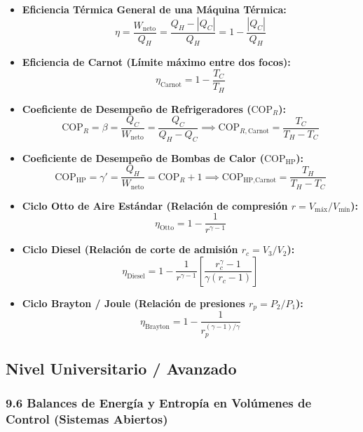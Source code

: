 \documentclass[11pt,a4paper]{article}
\begin{document}
\begin{itemize}
  \item \textbf{Eficiencia Térmica General de una Máquina Térmica:}
  \[
    \eta = \frac{W_{\text{neto}}}{Q_H} = \frac{Q_H - |Q_C|}{Q_H} = 1 - \frac{|Q_C|}{Q_H}
  \]
  \item \textbf{Eficiencia de Carnot (Límite máximo entre dos focos):}
  \[
    \eta_{\text{Carnot}} = 1 - \frac{T_C}{T_H}
  \]
  \item \textbf{Coeficiente de Desempeño de Refrigeradores ($\text{COP}_R$):}
  \[
    \text{COP}_R = \beta = \frac{Q_C}{W_{\text{neto}}} = \frac{Q_C}{Q_H - Q_C} \implies \text{COP}_{R,\text{Carnot}} = \frac{T_C}{T_H - T_C}
  \]
  \item \textbf{Coeficiente de Desempeño de Bombas de Calor ($\text{COP}_{\text{HP}}$):}
  \[
    \text{COP}_{\text{HP}} = \gamma' = \frac{Q_H}{W_{\text{neto}}} = \text{COP}_R + 1 \implies \text{COP}_{\text{HP},\text{Carnot}} = \frac{T_H}{T_H - T_C}
  \]
  \item \textbf{Ciclo Otto de Aire Estándar (Relación de compresión $r = V_{\text{máx}}/V_{\text{mín}}$):}
  \[
    \eta_{\text{Otto}} = 1 - \frac{1}{r^{\gamma - 1}}
  \]
  \item \textbf{Ciclo Diesel (Relación de corte de admisión $r_c = V_3/V_2$):}
  \[
    \eta_{\text{Diesel}} = 1 - \frac{1}{r^{\gamma - 1}} \left[ \frac{r_c^\gamma - 1}{\gamma(r_c - 1)} \right]
  \]
  \item \textbf{Ciclo Brayton / Joule (Relación de presiones $r_p = P_2/P_1$):}
  \[
    \eta_{\text{Brayton}} = 1 - \frac{1}{r_p^{(\gamma - 1)/\gamma}}
  \]
\end{itemize}

\subsection*{Nivel Universitario / Avanzado}

\subsubsection*{9.6 Balances de Energía y Entropía en Volúmenes de Control (Sistemas Abiertos)}
\end{document}
